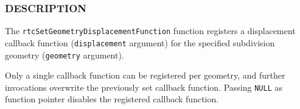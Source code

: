 \begin{Shaded}
\begin{Highlighting}[]

\OperatorTok{\{}
  \OperatorTok{*}\OperatorTok{;}
\OperatorTok{;}
   \OperatorTok{;}
   \OperatorTok{;}
   \OperatorTok{*}\OperatorTok{;}
   \OperatorTok{*}\OperatorTok{;}
   \OperatorTok{*}\OperatorTok{;}
   \OperatorTok{*}\OperatorTok{;}
   \OperatorTok{*}\OperatorTok{;}
  \OperatorTok{*}\OperatorTok{;}
  \OperatorTok{*}\OperatorTok{;}
  \OperatorTok{*}\OperatorTok{;}
   \OperatorTok{;}
\OperatorTok{\};}

  \OperatorTok{(*}\OperatorTok{)(}
    \OperatorTok{*}
\OperatorTok{);}

\OperatorTok{(}
\OperatorTok{,}
\OperatorTok{);}
\end{Highlighting}
\end{Shaded}

\subsubsection{DESCRIPTION}\label{description}

The \texttt{rtcSetGeometryDisplacementFunction} function registers a
displacement callback function (\texttt{displacement} argument) for the
specified subdivision geometry (\texttt{geometry} argument).

Only a single callback function can be registered per geometry, and
further invocations overwrite the previously set callback function.
Passing \texttt{NULL} as function pointer disables the registered
callback function.


